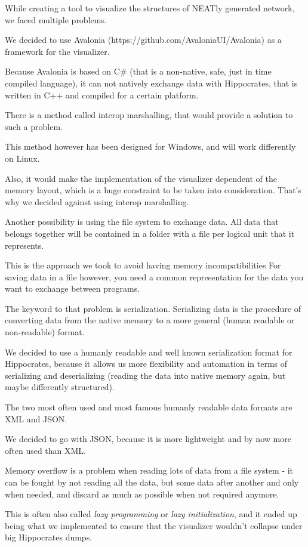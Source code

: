 While creating a tool to visualize the structures of NEATly generated network, we faced multiple problems.
	
We decided to use Avalonia (https://github.com/AvaloniaUI/Avalonia) as a framework for the visualizer.

Because Avalonia is based on C\# (that is a non-native, safe, just in time compiled language), it can not natively exchange data with Hippocrates, that is written in C++ and compiled for a certain platform.

There is a method called interop marshalling, that would provide a solution to such a problem.\cite{Microsoft2016}

This method however has been designed for Windows, and will work differently on Linux.

Also, it would make the implementation of the visualizer dependent of the memory layout, which is a huge constraint to be taken into consideration. That's why we decided against using interop marshalling.

Another possibility is using the file system to exchange data. All data that belongs together will be contained in a folder with a file per logical unit that it represents.

This is the approach we took to avoid having memory incompatibilities For saving data in a file however, you need a common representation for the data you want to exchange between programs. 

The keyword to that problem is serialization. Serializing data is the procedure of converting data from the native memory to a more general (human readable or non-readable) format. 

We decided to use a humanly readable and well known serialization format for Hippocrates, because it allows us more flexibility and automation in terms of serializing and deserializing (reading the data into native memory again, but maybe differently structured).

The two most often used and most famous humanly readable data formats are XML and JSON.\cite{Strassner2015}

We decided to go with JSON, because it is more lightweight and by now more often used than XML.

Memory overflow is a problem when reading lots of data from a file system - it can be fought by not reading all the data, but some data after another and only when needed, and discard as much as possible when not required anymore.

This is often also called \emph{lazy programming} or \emph{lazy initialization}, and it ended up being what we implemented to ensure that the visualizer wouldn't collapse under big Hippocrates dumps.
